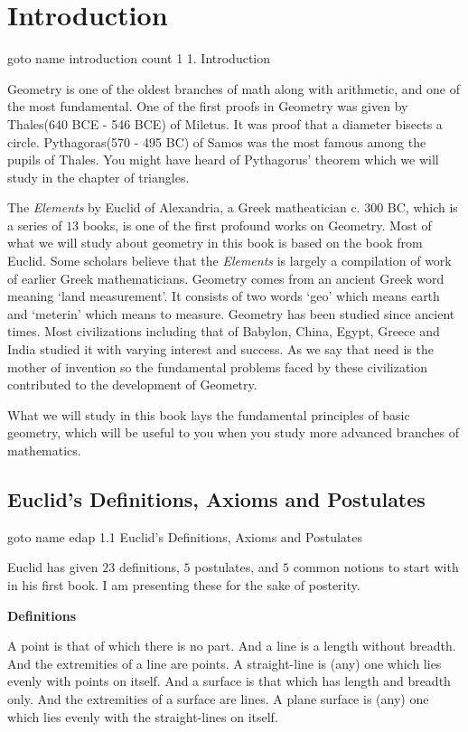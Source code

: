 \chapter{Introduction}

\pdfoutline goto name {introduction} count 1 {1. Introduction}%
%


\color{black}Geometry is one of the oldest branches of math along with arithmetic, and one of the most
fundamental. One of the first proofs in Geometry was given by Thales(640 BCE - 546 BCE) of Miletus. It was
proof that a diameter bisects a circle. Pythagoras(570 - 495 BC) of Samos was the most famous among the pupils of
Thales. You might have heard of Pythagorus' theorem which we will study in the chapter of triangles.

The {\it Elements} by Euclid of Alexandria, a Greek matheatician c. $300$ BC, which is a series of $13$
books, is one of the first profound works on Geometry. Most of what we will study about geometry in this
book is based on the book from Euclid. Some scholars believe that the {\it Elements} is
largely a compilation of work of earlier Greek mathematicians. Geometry comes from an ancient Greek word
meaning `land measurement'. It consists of two words `geo' which means earth and `meterin' which means to
measure. Geometry has been studied since ancient times. Most civilizations including that of Babylon, China,
Egypt, Greece and India studied it with varying interest and success. As we say that need is the mother of
invention so the fundamental problems faced by these civilization contributed to the development of
Geometry.

What we will study in this book lays the fundamental principles of basic
geometry, which will be useful to you when you study more advanced branches of mathematics.

\section{Euclid's Definitions, Axioms and Postulates}

\pdfoutline goto name {edap}  {1.1 Euclid's Definitions, Axioms and Postulates}%
%

Euclid has given $23$ definitions, $5$ postulates, and $5$ common notions to start with in his first
book. I am presenting these for the sake of posterity.

\vskip0.5cm
{\bf Definitions}

\numberedlist
\li A point is that of which there is no part.
\li And a line is a length without breadth.
\li And the extremities of a line are points.
\li A straight-line is (any) one which lies evenly with points on itself.
\li And a surface is that which has length and breadth only.
\li And the extremities of a surface are lines.
\li A plane surface is (any) one which lies evenly with the straight-lines on itself.
\endnumberedlist

 \endchapter